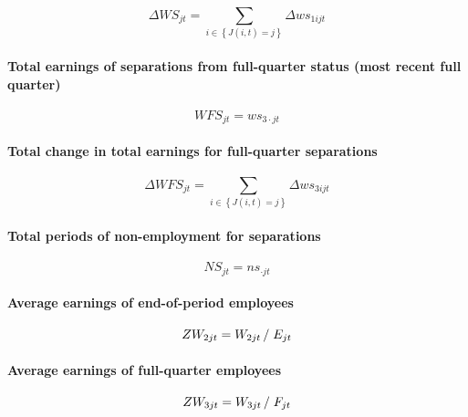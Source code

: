 \begin{equation}
\Delta WS_{jt} = \sum\limits_{i \in \left\{ {J(i,t) = j} \right\}} {\Delta
ws_{1ijt} }
\end{equation}

\paragraph{Total earnings of separations from full-quarter status (most
recent full quarter)}

\begin{equation}
WFS_{jt}=ws_{3\cdot jt}
\end{equation}

\paragraph{Total change in total earnings for full-quarter separations}

\begin{equation}
\Delta WFS_{jt} = \sum\limits_{i \in \left\{ {J(i,t) = j} \right\}} {\Delta
ws_{3ijt} }
\end{equation}

\paragraph{Total periods of non-employment for separations}

\begin{equation}
NS_{jt} = ns_{\cdot jt}
\end{equation}

\paragraph{Average earnings of end-of-period employees}

\begin{equation}
ZW_{2jt} = {W_{2jt} } \left/ {\vphantom {{W_{2jt} } {E_{jt} }}} \right. {%
E_{jt} }
\end{equation}

\paragraph{Average earnings of full-quarter employees}

\begin{equation}
ZW_{3jt} = {W_{3jt} } \left/ {\vphantom {{W_{3jt} } {F_{jt} }}} \right. {%
F_{jt} }
\end{equation}

